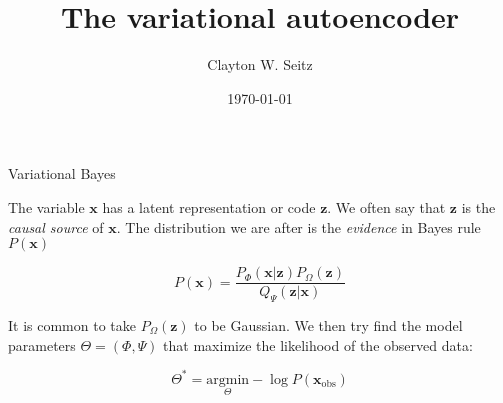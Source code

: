 \documentclass{beamer}					%
\title{The variational autoencoder}	%
\author{Clayton W. Seitz}								%
\date{\today}									%
\begin{document}
\begin{frame}
  \titlepage
\end{frame}



%



%


\begin{frame}{Variational Bayes}

The variable $\mathbf{x}$ has a latent representation or code $\mathbf{z}$. We often say that $\mathbf{z}$ is the \emph{causal source} of $\mathbf{x}$. The distribution we are after is the \emph{evidence} in Bayes rule $P(\mathbf{x})$

\begin{equation*}
P(\mathbf{x}) = \frac{P_{\Phi}(\mathbf{x|z})P_{\Omega}(\mathbf{z})}{Q_{\Psi}(\mathbf{z|x})}
\end{equation*}

It is common to take $P_{\Omega}(\mathbf{z})$ to be Gaussian. We then try find the model parameters $\Theta = (\Phi,\Psi)$ that maximize the likelihood of the observed data:

\begin{equation*}
\Theta^{*} = \underset{\Theta}{\mathrm{argmin}} -\log P(\mathbf{x}_{\textrm{obs}}) 
\end{equation*}


\end{frame}
\end{document}
